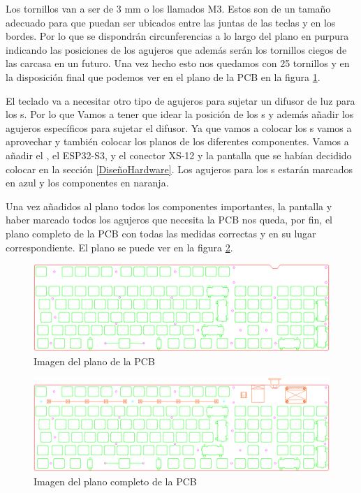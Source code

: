 Los tornillos van a ser de 3 mm o los llamados M3. Estos son de un tamaño adecuado para que puedan ser ubicados entre las juntas de las teclas y en los bordes. Por lo que se dispondrán circunferencias a lo largo del plano en purpura indicando las posiciones de los agujeros que además serán los tornillos ciegos de las carcasa en un futuro. Una vez hecho esto nos quedamos con 25 tornillos y en la disposición final que podemos ver en el plano de la \gls{PCB} en la figura \ref{fig:PlanoPCB}.

El teclado va a necesitar otro tipo de agujeros para sujetar un difusor de luz para los s. Por lo que Vamos a tener que idear la posición de los s y además añadir los agujeros específicos para sujetar el difusor. Ya que vamos a colocar los s vamos a aprovechar y también colocar los planos de los diferentes componentes. Vamos a añadir el , el ESP32-S3, y el conector XS-12 y la pantalla que se habían decidido colocar en la sección \ref{DiseñoHardware}. Los agujeros para los s estarán marcados en azul y los componentes en naranja.

Una vez añadidos al plano todos los componentes importantes, la pantalla y haber marcado todos los agujeros que necesita la \gls{PCB} nos queda, por fin, el plano completo de la \gls{PCB} con todas las medidas correctas y en su lugar correspondiente. El plano se puede ver en la figura \ref{fig:PlanoPCBConTodo}.

\begin{figure}[H]
    \centering
    \includegraphics[width=1\textwidth]{imagenes/Capitulos/Cap05/PlanoPCB.png}
    \caption{Imagen del plano de la \gls{PCB} \cite{Repo:Planos}}
    \label{fig:PlanoPCB}
\end{figure}

\begin{figure}[H]
    \centering
    \includegraphics[width=1\textwidth]{imagenes/Capitulos/Cap05/PlanoConPartes.png}
    \caption{Imagen del plano completo de la \gls{PCB} \cite{Repo:Planos}}
    \label{fig:PlanoPCBConTodo}
\end{figure}

